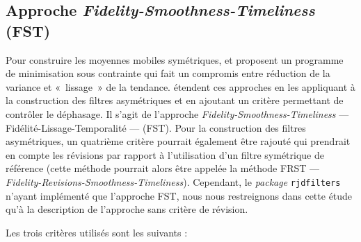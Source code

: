 \documentclass[
  12pt,
  french,
  12pt,a4paper]{article}
\newcommand\1{\mathds{1}}
\begin{document}
\hypertarget{subsec-GuggemosEtAl}{%
\subsection{\texorpdfstring{Approche \emph{Fidelity-Smoothness-Timeliness} (FST)}{Approche Fidelity-Smoothness-Timeliness (FST)}}\label{subsec-GuggemosEtAl}}

Pour construire les moyennes mobiles symétriques, \textcite{GrunRehommeLadiray1994} et \textcite{GrayThomson1996} proposent un programme de minimisation sous contrainte qui fait un compromis entre réduction de la variance et «~lissage~» de la tendance.
\textcite{ch15HBSA} étendent ces approches en les appliquant à la construction des filtres asymétriques et en ajoutant un critère permettant de contrôler le déphasage.
Il s'agit de l'approche \emph{Fidelity-Smoothness-Timeliness} --- Fidélité-Lissage-Temporalité --- (FST).
Pour la construction des filtres asymétriques, un quatrième critère pourrait également être rajouté qui prendrait en compte les révisions par rapport à l'utilisation d'un filtre symétrique de référence (cette méthode pourrait alors être appelée la méthode FRST --- \emph{Fidelity-Revisions-Smoothness-Timeliness}).
Cependant, le \emph{package} \texttt{rjdfilters} n'ayant implémenté que l'approche FST, nous nous restreignons dans cette étude qu'à la description de l'approche sans critère de révision.

Les trois critères utilisés sont les suivants :
\end{document}

